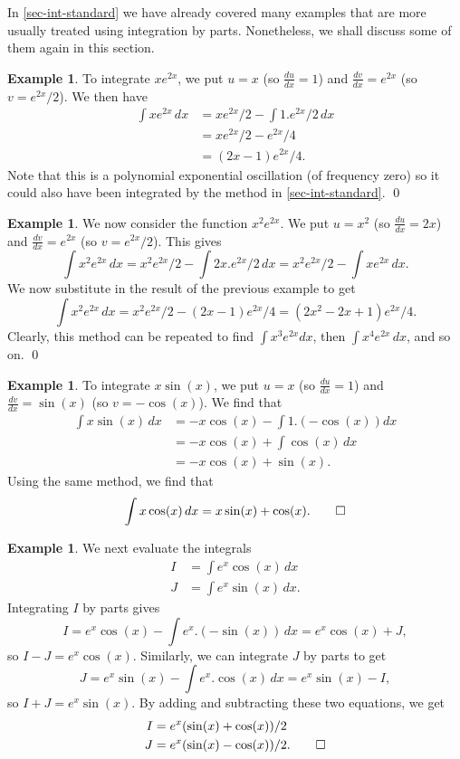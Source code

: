 \documentclass[a4paper]{book}
\renewcommand{\:}{\colon}
\theoremstyle{definition}
\newtheorem{example}[theorem]{Example}
\begin{document}
In \autoref{sec-int-standard} we have already covered many
examples that are more usually treated using integration by parts.  
Nonetheless, we shall discuss some of them again in this section.
\begin{example}
 To integrate $xe^{2x}$, we put $u=x$ (so $\frac{du}{dx}=1$) and
 $\frac{dv}{dx}=e^{2x}$ (so $v=e^{2x}/2$).  We then have
 \begin{align*}
  \int x e^{2x}\,dx &= xe^{2x}/2 - \int 1.e^{2x}/2 \,dx  \\
                    &= xe^{2x}/2 - e^{2x}/4  \\
                    &= (2x-1)e^{2x}/4.
 \end{align*}
 Note that this is a polynomial exponential oscillation (of frequency
 zero) so it could also have been integrated by the method in
 \autoref{sec-int-standard}.
 \qed
\end{example}
\begin{example}
 We now consider the function $x^2e^{2x}$.  We put $u=x^2$ (so
 $\frac{du}{dx}=2x$) and $\frac{dv}{dx}=e^{2x}$ (so $v=e^{2x}/2$).
 This gives
 \[ \int x^2e^{2x}\,dx = x^2e^{2x}/2 - \int 2x.e^{2x}/2\,dx
                       = x^2e^{2x}/2 - \int xe^{2x}\, dx.
 \]
 We now substitute in the result of the previous example to get
 \[ \int x^2e^{2x}\,dx = x^2e^{2x}/2 - (2x-1)e^{2x}/4
                       = (2x^2-2x+1)e^{2x}/4.
 \]
 Clearly, this method can be repeated to find $\int x^3e^{2x}dx$, then
 $\int x^4e^{2x}\,dx$, and so on. \qed
\end{example}
\begin{example}
 To integrate $x\sin(x)$, we put $u=x$ (so $\frac{du}{dx}=1$) and
 $\frac{dv}{dx}=\sin(x)$ (so $v=-\cos(x)$).  We find that
 \begin{align*}
  \int x\sin(x)\,dx &= -x\cos(x) - \int 1.(-\cos(x)) dx \\
     &= -x\cos(x) + \int \cos(x)\, dx \\
     &= -x\cos(x) + \sin(x).
 \end{align*}
 Using the same method, we find that
 \[ \int x\cos(x)\, dx = x\sin(x) + \cos(x). \qed \]
\end{example}
\begin{example}
 We next evaluate the integrals
 \begin{align*}
  I &= \int e^x\cos(x)\, dx \\
  J &= \int e^x\sin(x)\, dx.
 \end{align*}
 Integrating $I$ by parts gives
 \[ I = e^x\cos(x) - \int e^x.(-\sin(x))\,dx = e^x\cos(x) + J, \]
 so $I-J=e^x\cos(x)$.  Similarly, we can integrate $J$ by parts to get
 \[ J = e^x\sin(x) - \int e^x.\cos(x)\, dx = e^x\sin(x) - I, \]
 so $I+J=e^x\sin(x)$.  By adding and subtracting these two equations,
 we get
 \begin{align*}
  I &= e^x(\sin(x)+\cos(x))/2 \\
  J &= e^x(\sin(x)-\cos(x))/2. \qed
 \end{align*}
\end{example}
\end{document}
